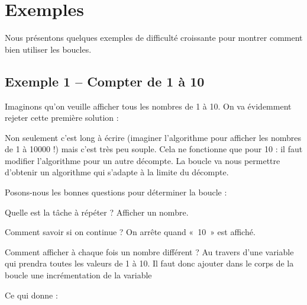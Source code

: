 \section{Exemples}

	Nous présentons quelques exemples de difficulté
	croissante pour montrer comment bien utiliser les boucles.

	\subsection{Exemple 1 -- Compter de 1 à 10}

		Imaginons qu'on veuille afficher tous les nombres de 1 à 10. 
		On va évidemment rejeter cette première solution :


		Non seulement c'est long à écrire 
		(imaginer l'algorithme pour afficher les nombres de 1 à 10000 !) 
		mais c'est très peu souple.
		Cela ne fonctionne que pour 10 : il faut modifier l'algorithme pour
		un autre décompte. La boucle va nous permettre
		d'obtenir un algorithme qui s'adapte
		à la limite du décompte.

		Posons-nous les bonnes questions pour déterminer la boucle :

		\begin{liste}
		\item 
			Quelle est la tâche à répéter ? Afficher un nombre.
		\item 
			Comment savoir si on continue ? On arrête quand «~10~» est affiché.
		\item 
			Comment afficher à chaque fois un nombre différent ? 
			Au travers d'une variable qui prendra toutes les valeurs de 1 à 10. 
			Il faut donc ajouter dans le corps de la
			boucle une incrémentation de la variable
		\end{liste}

		Ce qui donne :


